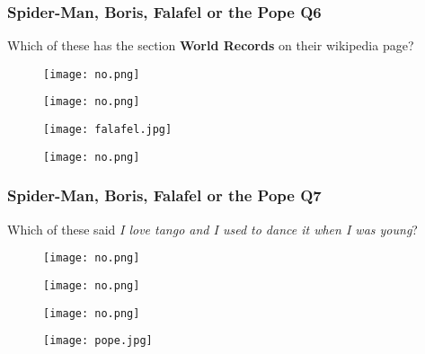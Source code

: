 \documentclass{beamer}
\begin{document}
\begin{frame}
\frametitle{Spider-Man, Boris, Falafel or the Pope Q6}
Which of these has the section \textbf{World Records} on their wikipedia page?
\begin{figure}[!htb]
    \centering
    \begin{minipage}{.5\textwidth}
        \centering
        \texttt{[image: no.png]}
        
    \end{minipage}%
    \begin{minipage}{0.5\textwidth}
        \centering
        \texttt{[image: no.png]}
        
    \end{minipage}
\end{figure}
\begin{figure}[!htb]
    \centering
    \begin{minipage}{.5\textwidth}
        \centering
        \texttt{[image: falafel.jpg]}
        
    \end{minipage}%
    \begin{minipage}{0.5\textwidth}
        \centering
        \texttt{[image: no.png]}
        
    \end{minipage}
\end{figure}
\end{frame}

\begin{frame}
\frametitle{Spider-Man, Boris, Falafel or the Pope Q7}
Which of these said \textit{I love tango and I used to dance it when I was young}?
\begin{figure}[!htb]
    \centering
    \begin{minipage}{.5\textwidth}
        \centering
        \texttt{[image: no.png]}
        
    \end{minipage}%
    \begin{minipage}{0.5\textwidth}
        \centering
        \texttt{[image: no.png]}
        
    \end{minipage}
\end{figure}
\begin{figure}[!htb]
    \centering
    \begin{minipage}{.5\textwidth}
        \centering
        \texttt{[image: no.png]}
        
    \end{minipage}%
    \begin{minipage}{0.5\textwidth}
        \centering
        \texttt{[image: pope.jpg]}
        
    \end{minipage}
\end{figure}
\end{frame}
\end{document}
